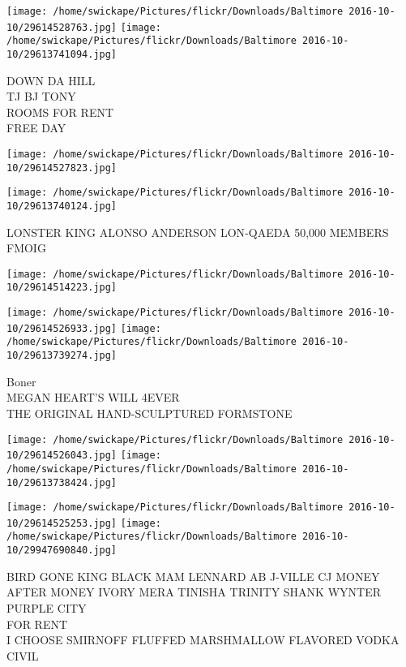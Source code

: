 \documentclass[10pt,letterpaper]{article}
\begin{document}
\texttt{[image: /home/swickape/Pictures/flickr/Downloads/Baltimore 2016-10-10/29614528763.jpg]}
\texttt{[image: /home/swickape/Pictures/flickr/Downloads/Baltimore 2016-10-10/29613741094.jpg]}

DOWN DA HILL\\
TJ BJ TONY\\
ROOMS FOR RENT\\
FREE DAY\\
\pagebreak

\texttt{[image: /home/swickape/Pictures/flickr/Downloads/Baltimore 2016-10-10/29614527823.jpg]}

\vspace{0.25in}
\texttt{[image: /home/swickape/Pictures/flickr/Downloads/Baltimore 2016-10-10/29613740124.jpg]}

LONSTER KING ALONSO ANDERSON LON{-}QAEDA 50,000 MEMBERS\\
FMOIG\\
\pagebreak

\texttt{[image: /home/swickape/Pictures/flickr/Downloads/Baltimore 2016-10-10/29614514223.jpg]}

\vspace{0.25in}
\texttt{[image: /home/swickape/Pictures/flickr/Downloads/Baltimore 2016-10-10/29614526933.jpg]}
\texttt{[image: /home/swickape/Pictures/flickr/Downloads/Baltimore 2016-10-10/29613739274.jpg]}

Boner\\
MEGAN HEART'S WILL 4EVER\\
THE ORIGINAL HAND{-}SCULPTURED FORMSTONE\\
\pagebreak

\texttt{[image: /home/swickape/Pictures/flickr/Downloads/Baltimore 2016-10-10/29614526043.jpg]}
\texttt{[image: /home/swickape/Pictures/flickr/Downloads/Baltimore 2016-10-10/29613738424.jpg]}

\texttt{[image: /home/swickape/Pictures/flickr/Downloads/Baltimore 2016-10-10/29614525253.jpg]}
\texttt{[image: /home/swickape/Pictures/flickr/Downloads/Baltimore 2016-10-10/29947690840.jpg]}

BIRD GONE KING BLACK MAM LENNARD AB J{-}VILLE CJ MONEY AFTER MONEY IVORY MERA TINISHA TRINITY SHANK WYNTER PURPLE CITY\\
FOR RENT\\
I CHOOSE SMIRNOFF FLUFFED MARSHMALLOW FLAVORED VODKA\\
CIVIL\\
\pagebreak
\end{document}
